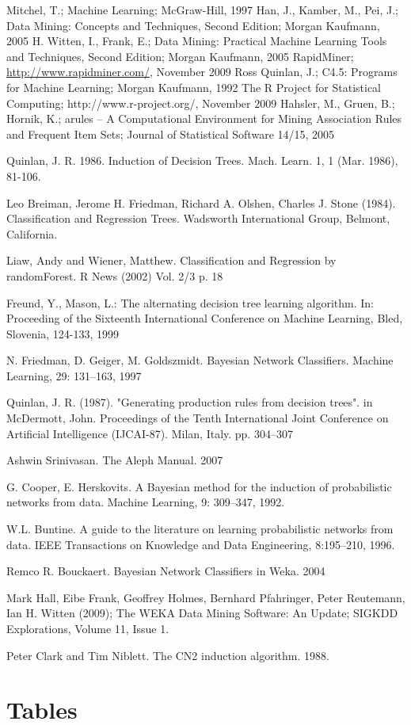 \documentclass[a4paper]{llncs}
\begin{document}
\begin{thebibliography}{1}
Mitchel, T.; Machine Learning; McGraw-Hill, 1997
Han, J., Kamber, M., Pei, J.; Data Mining: Concepts and Techniques, Second Edition; Morgan Kaufmann, 2005
H. Witten, I., Frank, E.; Data Mining: Practical Machine Learning Tools and Techniques, Second Edition; Morgan Kaufmann, 2005
RapidMiner; \url{http://www.rapidminer.com/}, November 2009
Ross Quinlan, J.; C4.5: Programs for Machine Learning; Morgan Kaufmann, 1992
The R Project for Statistical Computing; http://www.r-project.org/, November 2009
Hahsler, M., Gruen, B.; Hornik, K.; arules -- A Computational Environment for Mining Association Rules and Frequent Item Sets; Journal of Statistical Software 14/15, 2005

Quinlan, J. R. 1986. Induction of Decision Trees. Mach. Learn. 1, 1 (Mar. 1986), 81-106.

Leo Breiman, Jerome H. Friedman, Richard A. Olshen, Charles J. Stone (1984). Classification and Regression Trees. Wadsworth International Group, Belmont, California.

Liaw, Andy and Wiener, Matthew. Classification and Regression by randomForest. R News (2002) Vol. 2/3 p. 18

Freund, Y., Mason, L.: The alternating decision tree learning algorithm. In: Proceeding of the Sixteenth International Conference on Machine Learning, Bled, Slovenia, 124-133, 1999

N. Friedman, D. Geiger, M. Goldszmidt. Bayesian Network Classifiers. Machine Learning, 29: 131–163, 1997

Quinlan, J. R. (1987). "Generating production rules from decision trees". in McDermott, John. Proceedings of the Tenth International Joint Conference on Artificial Intelligence (IJCAI-87). Milan, Italy. pp. 304–307

Ashwin Srinivasan. The Aleph Manual. 2007

G. Cooper, E. Herskovits. A Bayesian method for the induction of probabilistic networks from 
data. Machine Learning, 9: 309–347, 1992.

W.L. Buntine. A guide to the literature on learning probabilistic networks from data. IEEE 
Transactions on Knowledge and Data Engineering, 8:195–210, 1996.

Remco R. Bouckaert. Bayesian Network Classifiers in Weka. 2004

Mark Hall, Eibe Frank, Geoffrey Holmes, Bernhard Pfahringer, Peter Reutemann, Ian H. Witten (2009); The WEKA Data Mining Software: An Update; SIGKDD Explorations, Volume 11, Issue 1.

Peter Clark and Tim Niblett. The CN2 induction algorithm. 1988.

\end{thebibliography}

\clearpage

\appendix

\section{Tables}
\end{document}
